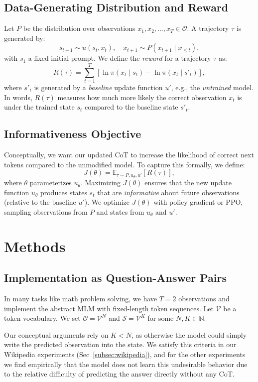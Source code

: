 \documentclass{article}
\theoremstyle{plain}
\theoremstyle{definition}
\theoremstyle{remark}
\begin{document}
\subsection{Data-Generating Distribution and Reward}

Let $P$ be the distribution over observations $x_1, x_2, \dots, x_T \in \mathcal{O}$. A trajectory $\tau$ is generated by:
\[
s_{t+1}\sim u(s_t, x_t), \quad x_{t+1}\sim P(x_{t+1}\mid x_{\le t}),
\]
with $s_1$ a fixed initial prompt. We define the \emph{reward} for a trajectory $\tau$ as:
\[
R(\tau)=\sum_{t=1}^T \left[\ln \pi(x_t\mid s_t)-\ln \pi(x_t\mid s'_t)\right],
\]
where $s'_t$ is generated by a \emph{baseline} update function $u'$, e.g., the \emph{untrained} model. In words, $R(\tau)$ measures how much more likely the correct observation $x_t$ is under the trained state $s_t$ compared to the baseline state $s'_t$.

\subsection{Informativeness Objective}

Conceptually, we want our updated CoT to increase the likelihood of correct next tokens compared to the unmodified model. 
To capture this formally, we define:
\[
  J(\theta)=\mathbb{E}_{\tau \sim P,u_\theta,u'}\left[R(\tau)\right],
\]
where $\theta$ parameterizes $u_\theta$. Maximizing $J(\theta)$ ensures that the new update function $u_\theta$ produces states $s_t$ that are \emph{informative} about future observations (relative to the baseline $u'$). We optimize $J(\theta)$ with policy gradient or PPO, sampling observations from $P$ and states from $u_\theta$ and $u'$.

\section{Methods}
\label{sec:method}

\subsection{Implementation as Question-Answer Pairs}
In many tasks like math problem solving, we have $T=2$ observations and implement the abstract MLM with fixed-length token sequences. Let $\mathcal{V}$ be a token vocabulary. We set $\mathcal{O} = \mathcal{V}^N$ and $\mathcal{S} = \mathcal{V}^K$ for some $N, K \in \mathbb{N}$. 

Our conceptual arguments rely on $K < N$, as otherwise the model could simply write the predicted observation into the state. We satisfy this criteria in our Wikipedia experiments (Sec~\ref{subsec:wikipedia}), and for the other experiments we find empirically that the model does not learn this undesirable behavior due to the relative difficulty of predicting the answer directly without any CoT.
\end{document}
